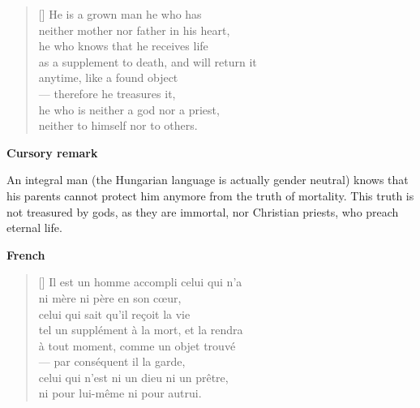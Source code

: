 \documentclass[a4paper,12pt,twoside,final]{book}
\begin{document}
\newpage



\settowidth{\versewidth}{he who knows that he receives so much life}

\begin{verse}[\versewidth]
  He is a grown man he who has \\
  neither mother nor father in his heart, \\
  he who knows that he receives life \\
  as a supplement to death, and will return it \\
  anytime, like a found object \\
  --- therefore he treasures it, \\
  he who is neither a god nor a priest, \\
  neither to himself nor to others. \\
\end{verse}

\bigskip

\noindent \textbf{Cursory remark}

\medskip

An integral man (the Hungarian language is actually gender neutral)
knows that his parents cannot protect him anymore from the truth of
mortality. This truth is not treasured by gods, as they are immortal,
nor Christian priests, who preach eternal life.

\bigskip

\noindent \textbf{French}


\settowidth{\versewidth}{tel un supplément à la mort, et qu'il la rendra}

\begin{verse}[\versewidth]
  Il est un homme accompli celui qui n'a \\
  ni mère ni père en son cœur, \\
  celui qui sait qu'il reçoit la vie \\
  tel un supplément à la mort, et la rendra \\
  à tout moment, comme un objet trouvé \\
  --- par conséquent il la garde, \\
  celui qui n'est ni un dieu ni un prêtre, \\
  ni pour lui-même ni pour autrui. \\
\end{verse}
\end{document}
